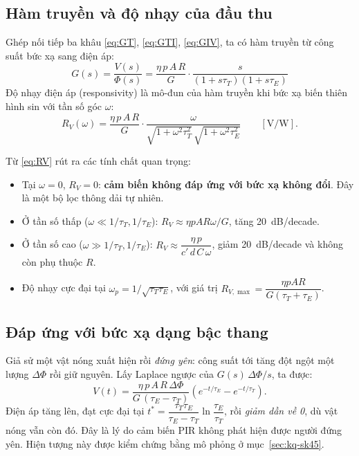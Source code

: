 \subsection{Hàm truyền và độ nhạy của đầu thu}

Ghép nối tiếp ba khâu \eqref{eq:GT}, \eqref{eq:GTI}, \eqref{eq:GIV}, ta có hàm truyền từ công suất bức xạ sang điện áp:
\begin{equation}
  \boxed{\,G(s) = \frac{V(s)}{\Phi(s)} = \frac{\eta\,p\,A\,R}{G}\cdot\frac{s}{(1+s\tau_T)(1+s\tau_E)}\,}
  \label{eq:Gs}
\end{equation}
Độ nhạy điện áp (responsivity) là mô-đun của hàm truyền khi bức xạ biến thiên hình sin với tần số góc $\omega$:
\begin{equation}
  R_V(\omega) = \frac{\eta\,p\,A\,R}{G}\cdot\frac{\omega}{\sqrt{1+\omega^2\tau_T^2}\,\sqrt{1+\omega^2\tau_E^2}}\qquad[\text{V/W}].
  \label{eq:RV}
\end{equation}

Từ \eqref{eq:RV} rút ra các tính chất quan trọng:
\begin{itemize}
  \item Tại $\omega = 0$, $R_V = 0$: \textbf{cảm biến không đáp ứng với bức xạ không đổi}. Đây là một bộ lọc thông dải tự nhiên.
  \item Ở tần số thấp ($\omega \ll 1/\tau_T, 1/\tau_E$): $R_V \approx \eta pAR\omega/G$, tăng 20~dB/decade.
  \item Ở tần số cao ($\omega \gg 1/\tau_T, 1/\tau_E$): $R_V \approx \dfrac{\eta\,p}{c'\,d\,C\,\omega}$, giảm 20~dB/decade và không còn phụ thuộc $R$.
  \item Độ nhạy cực đại tại $\omega_p = 1/\sqrt{\tau_T\tau_E}$, với giá trị $R_{V,\max} = \dfrac{\eta pAR}{G(\tau_T+\tau_E)}$.
\end{itemize}

\subsection{Đáp ứng với bức xạ dạng bậc thang}
\label{sec:dapungbac}

Giả sử một vật nóng xuất hiện rồi \emph{đứng yên}: công suất tới tăng đột ngột một lượng $\Delta\Phi$ rồi giữ nguyên. Lấy Laplace ngược của $G(s)\,\Delta\Phi/s$, ta được:
\begin{equation}
  V(t) = \frac{\eta\,p\,A\,R\,\Delta\Phi}{G\,(\tau_E-\tau_T)}\left(e^{-t/\tau_E}-e^{-t/\tau_T}\right).
  \label{eq:step}
\end{equation}
Điện áp tăng lên, đạt cực đại tại $t^* = \dfrac{\tau_T\tau_E}{\tau_E-\tau_T}\ln\dfrac{\tau_E}{\tau_T}$, rồi \emph{giảm dần về 0}, dù vật nóng vẫn còn đó. Đây là lý do cảm biến PIR không phát hiện được người đứng yên. Hiện tượng này được kiểm chứng bằng mô phỏng ở mục~\ref{sec:kq-sk45}.

